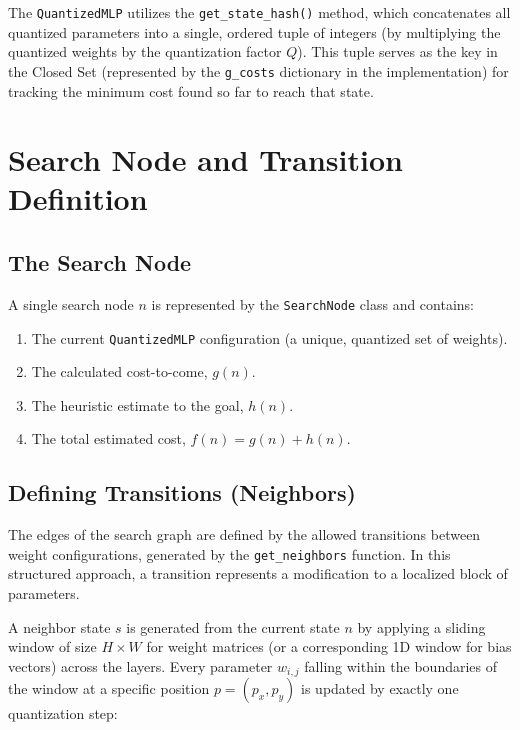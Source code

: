 The \texttt{QuantizedMLP} utilizes the \texttt{get\_state\_hash()} method, which concatenates all quantized parameters into a single, ordered tuple of integers (by multiplying the quantized weights by the quantization factor $Q$). This tuple serves as the key in the Closed Set (represented by the \texttt{g\_costs} dictionary in the implementation) for tracking the minimum cost found so far to reach that state.

\section{Search Node and Transition Definition}

\subsection{The Search Node}
A single search node $n$ is represented by the \texttt{SearchNode} class and contains:
\begin{enumerate}
    \item The current \texttt{QuantizedMLP} configuration (a unique, quantized set of weights).
    \item The calculated cost-to-come, $g(n)$.
    \item The heuristic estimate to the goal, $h(n)$.
    \item The total estimated cost, $f(n) = g(n) + h(n)$.
\end{enumerate}








\subsection{Defining Transitions (Neighbors)}
The edges of the search graph are defined by the allowed transitions between weight configurations, generated by the \texttt{get\_neighbors} function. In this structured approach, a transition represents a modification to a localized block of parameters.

A neighbor state $s$ is generated from the current state $n$ by applying a sliding window of size $H \times W$ for weight matrices (or a corresponding 1D window for bias vectors) across the layers. Every parameter $w_{i,j}$ falling within the boundaries of the window at a specific position $p=(p_x, p_y)$ is updated by exactly one quantization step:

